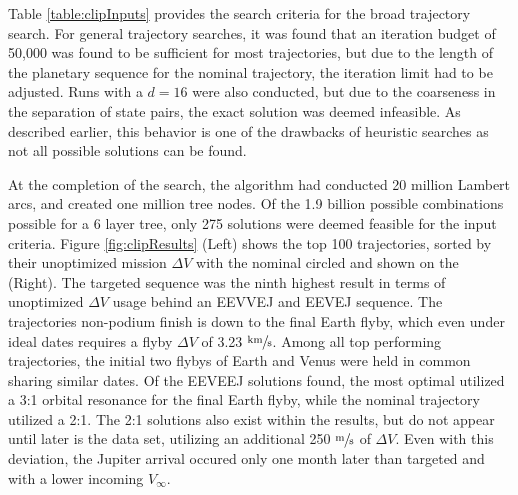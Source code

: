 \documentclass[letterpaper, preprint, paper,11pt]{AAS}	%
\begin{document}
Table \ref*{table:clipInputs} provides the search criteria for the broad trajectory search. For general trajectory searches, it was found that an iteration budget of 50,000 was found to be sufficient for most trajectories, but due to the length of the planetary sequence for the nominal trajectory, the iteration limit had to be adjusted. Runs with a $d = 16$ were also conducted, but due to the coarseness in the separation of state pairs, the exact solution was deemed infeasible. As described earlier, this behavior is one of the drawbacks of heuristic searches as not all possible solutions can be found. 

At the completion of the search, the algorithm had conducted 20 million Lambert arcs, and created one million tree nodes. Of the 1.9 billion possible combinations possible for a 6 layer tree, only 275 solutions were deemed feasible for the input criteria. Figure \ref*{fig:clipResults} (Left) shows the top 100 trajectories, sorted by their unoptimized mission $\Delta V$ with the nominal circled and shown on the (Right). The targeted sequence was the ninth highest result in terms of unoptimized $\Delta V$ usage behind an EEVVEJ and EEVEJ sequence. The trajectories non-podium finish is down to the final Earth flyby, which even under ideal dates requires a flyby $\Delta V$ of 3.23 $\sfrac{\text{km}}{\text{s}}$. Among all top performing trajectories, the initial two flybys of Earth and Venus were held in common sharing similar dates. Of the EEVEEJ solutions found, the most optimal utilized a 3:1 orbital resonance for the final Earth flyby, while the nominal trajectory utilized a 2:1. The 2:1 solutions also exist within the results, but do not appear until later is the data set, utilizing an additional 250 $\sfrac{\text{m}}{\text{s}}$ of $\Delta V$. Even with this deviation, the Jupiter arrival occured only one month later than targeted and with a lower incoming $V_\infty$.
\end{document}
